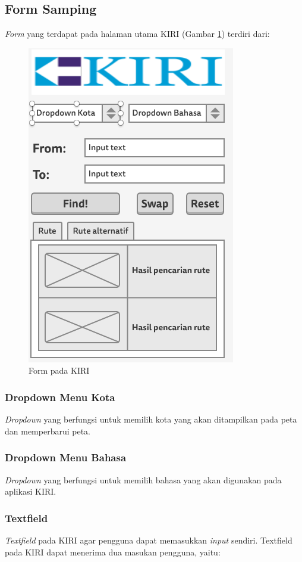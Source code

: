 \subsection{Form Samping}
\textit{Form} yang terdapat pada halaman utama KIRI (Gambar \ref{fig:4_KIRI_form}) terdiri dari:
\begin{figure}[H]
	\centering
	\includegraphics[scale=0.5]{Gambar/mockup-form}
	\caption{Form pada KIRI} 
	\label{fig:4_KIRI_form}
\end{figure}

\subsubsection{Dropdown Menu Kota}
\textit{Dropdown} yang berfungsi untuk memilih kota yang akan ditampilkan pada peta dan memperbarui peta.

\subsubsection{Dropdown Menu Bahasa}
\textit{Dropdown} yang berfungsi untuk memilih bahasa yang akan digunakan pada aplikasi KIRI.


\subsubsection{Textfield}
\textit{Textfield} pada KIRI agar pengguna dapat memasukkan \textit{input} sendiri. Textfield pada KIRI dapat menerima dua masukan pengguna, yaitu:

